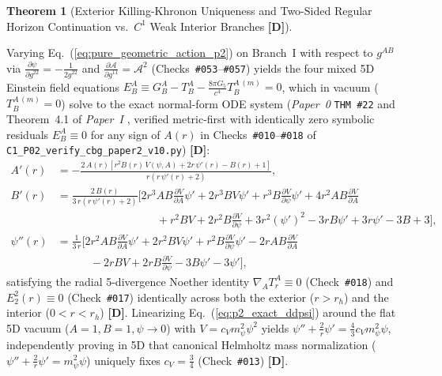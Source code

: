 \documentclass[11pt,a4paper]{article}
\newcommand{\catD}{\textbf{\textcolor{blue!75!black}{[D]}}}
\theoremstyle{plain}
\newtheorem{theorem}{Theorem}[section]
\theoremstyle{definition}
\theoremstyle{remark}
\numberwithin{equation}{section}
\begin{document}
\begin{theorem}[Exterior Killing-Khronon Uniqueness and Two-Sided Regular Horizon Continuation vs.\ $C^1$ Weak Interior Branches \catD]
\begin{enumerate}
\end{enumerate}
\end{theorem}

Varying Eq.~(\ref{eq:pure_geometric_action_p2}) on Branch~I with respect to $g^{AB}$ via $\frac{\partial\psi}{\partial g^{22}} = -\frac{1}{2g^{22}}$ and $\frac{\partial\mathcal{A}}{\partial g^{11}} = \mathcal{A}^2$ (Checks~\texttt{\#053}--\texttt{\#057}) yields the four mixed 5D Einstein field equations $E^A_B \equiv G^A_B - T^A_B - \frac{8\pi G_5}{c^4}T^{A\,(m)}_B = 0$, which in vacuum ($T^{A\,(m)}_B = 0$) solve to the exact normal-form ODE system (\textit{Paper~0} \texttt{THM~\#22} \cite{jimenez2026_p0} and Theorem~4.1 of \textit{Paper~I} \cite{jimenez2026a}, verified metric-first with identically zero symbolic residuals $E^A_B \equiv 0$ for any sign of $A(r)$ in Checks~\texttt{\#010}--\texttt{\#018} of \allowbreak\texttt{C1\_P02\_verify\_cbg\_paper2\_v10.py}) \catD:
\begin{align}
  A'(r) &= -\frac{2\,A(r)\left[r^2 B(r)\,V(\psi,A) + 2 r\,\psi'(r) - B(r) + 1\right]}{r\left(r\,\psi'(r) + 2\right)}, \label{eq:p2_exact_dA} \\[5pt]
  B'(r) &= \frac{2\,B(r)}{3\,r\left(r\,\psi'(r) + 2\right)}\Bigg[2 r^3 A B\frac{\partial V}{\partial A}\psi' + 2 r^3 B V\psi' + r^3 B\frac{\partial V}{\partial\psi}\psi' + 4 r^2 A B\frac{\partial V}{\partial A} \nonumber \\[3pt]
  &\qquad\qquad\qquad\qquad\quad + r^2 B V + 2 r^2 B\frac{\partial V}{\partial\psi} + 3 r^2(\psi')^2 - 3 r B\psi' + 3 r\psi' - 3 B + 3\Bigg], \label{eq:p2_exact_dB} \\[5pt]
  \psi''(r) &= \frac{1}{3\,r}\Bigg[2 r^2 A B\frac{\partial V}{\partial A}\psi' + 2 r^2 B V\psi' + r^2 B\frac{\partial V}{\partial\psi}\psi' - 2 r A B\frac{\partial V}{\partial A} \nonumber \\[3pt]
  &\qquad\quad - 2 r B V + 2 r B\frac{\partial V}{\partial\psi} - 3 B\psi' - 3\psi'\Bigg], \label{eq:p2_exact_ddpsi}
\end{align}
satisfying the radial 5-divergence Noether identity $\nabla_A T^A_r \equiv 0$ (Check~\texttt{\#018}) and $E^2_2(r) \equiv 0$ (Check~\texttt{\#017}) identically across both the exterior ($r > r_h$) and the interior ($0 < r < r_h$) \catD. Linearizing Eq.~(\ref{eq:p2_exact_ddpsi}) around the flat 5D vacuum ($A = 1, B = 1, \psi \to 0$) with $V = c_V m_{\psi}^2\psi^2$ yields $\psi'' + \frac{2}{r}\psi' = \frac{4}{3}c_V m_{\psi}^2\psi$, independently proving in 5D that canonical Helmholtz mass normalization ($\psi'' + \frac{2}{r}\psi' = m_{\psi}^2\psi$) uniquely fixes $c_V = \frac{3}{4}$ (Check~\texttt{\#013}) \catD.
\end{document}
